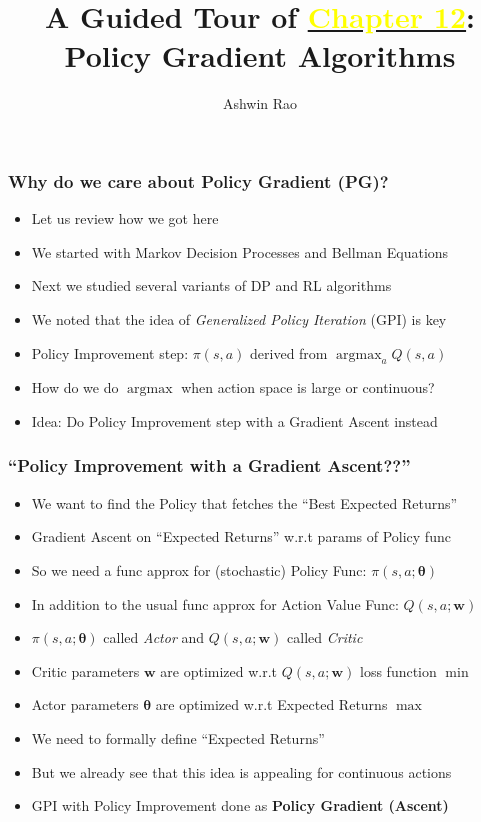 \documentclass[handout]{beamer}
\title[Policy Gradient Chapter]{A Guided Tour of \href{http://stanford.edu/~ashlearn/RLForFinanceBook/book.pdf}{\underline{\textcolor{yellow}{Chapter 12}}}: \\ Policy Gradient Algorithms} %
\author{Ashwin Rao} %
\institute[Stanford] %
{ICME, Stanford University
}
\date{} %
\DeclareMathOperator*{\argmax}{argmax}
\begin{document}
\begin{frame}
\titlepage %
\end{frame}

\begin{frame}
\frametitle{Why do we care about Policy Gradient (PG)?}
\pause
\begin{itemize}[<+->]
\item Let us review how we got here
\item We started with Markov Decision Processes and Bellman Equations
\item Next we studied several variants of DP and RL algorithms
\item We noted that the idea of {\em Generalized Policy Iteration} (GPI) is key
\item Policy Improvement step: $\pi(s, a)$ derived from $\argmax_a Q(s, a)$
\item How do we do $\argmax$ when action space is large or continuous?
\item Idea: Do Policy Improvement step with a Gradient Ascent instead
\end{itemize}
\end{frame}

\begin{frame}
\frametitle{``Policy Improvement with a Gradient Ascent??''}
\pause
\begin{itemize}[<+->]
\item We want to find the Policy that fetches the ``Best Expected Returns''
\item Gradient Ascent on ``Expected Returns'' w.r.t params of Policy func
\item So we need a func approx for (stochastic) Policy Func: $\pi(s, a; \bm{\theta})$
\item In addition to the usual func approx for Action Value Func: $Q(s, a; \bm{w})$
\item $\pi(s, a; \bm{\theta})$ called {\em Actor} and $Q(s, a; \bm{w})$ called {\em Critic}
\item Critic parameters $\bm{w}$ are optimized w.r.t $Q(s, a; \bm{w})$ loss function $\min$
\item Actor parameters $\bm{\theta}$ are optimized w.r.t Expected Returns $\max$
\item We need to formally define ``Expected Returns''
\item But we already see that this idea is appealing for continuous actions
\item GPI with Policy Improvement done as {\bf Policy Gradient (Ascent)}
\end{itemize}
\end{frame}
\end{document}
